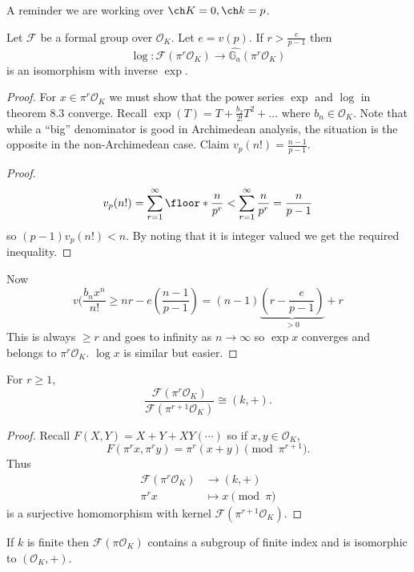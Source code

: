 \documentclass[a4paper]{article}
\theoremstyle{definition}
\theoremstyle{theorem}
\renewcommand*{\O}{\mathcal{O}}
\begin{document}
A reminder we are working over \(\ch K = 0, \ch k = p\).

\begin{proposition}
  Let \(\mathcal F\) be a formal group over \(\O_K\). Let \(e = v(p)\). If \(r > \frac{e}{p - 1}\) then
  \[
    \log: \mathcal F(\pi^r \O_K) \to \hat{\mathbb G_a}(\pi^r \O_K)
  \]
  is an isomorphism with inverse \(\exp\).
\end{proposition}

\begin{proof}
  For \(x \in \pi^r \O_K\) we must show that the power series \(\exp\) and \(\log\) in theorem 8.3 converge. Recall \(\exp(T) = T + \frac{b_2}{2!} T^2 + \dots\) where \(b_n \in \O_K\). Note that while a ``big'' denominator is good in Archimedean analysis, the situation is the opposite in the non-Archimedean case. Claim \(v_p(n!) = \frac{n - 1}{p - 1}\).

  \begin{proof}
    \[
      v_p(n!) = \sum_{r = 1}^\infty \floor*{\frac{n}{p^r}} < \sum_{r = 1}^\infty \frac{n}{p^r} = \frac{n}{p - 1}
    \]
    so \((p - 1) v_p(n!) < n\). By noting that it is integer valued we get the required inequality.
  \end{proof}

  Now
  \[
    v(\frac{b_n x^n}{n!} \geq nr - e \left(\frac{n - 1}{p - 1}\right) = (n - 1) \underbrace{(r - \frac{e}{p - 1})}_{> 0} + r
  \]
  This is always \(\geq r\) and goes to infinity as \(n \to \infty\) so \(\exp x\) converges and belongs to \(\pi^r \O_K\). \(\log x\) is similar but easier.
\end{proof}

\begin{proposition}
  For \(r \geq 1\),
  \[
    \frac{\mathcal F(\pi^r \O_K)}{\mathcal F (\pi^{r + 1} \O_K)} \cong (k, +).
  \]
\end{proposition}

\begin{proof}
  Recall \(F(X, Y) = X + Y + XY (\cdots)\) so if \(x, y \in \O_K\),
  \[
    F(\pi^rx, \pi^ry) = \pi^r(x + y) \pmod{\pi^{r + 1}}.
  \]
  Thus
  \begin{align*}
    \mathcal F(\pi^r \O_K) &\to (k, +) \\
    \pi^r x &\mapsto x \pmod \pi
  \end{align*}
  is a surjective homomorphism with kernel \(\mathcal F(\pi^{r + 1}\O_K)\).
\end{proof}

\begin{corollary}
  If \(k\) is finite then \(\mathcal F(\pi \O_K)\) contains a subgroup of finite index and is isomorphic to \((\O_K, +)\).
\end{corollary}
\end{document}
